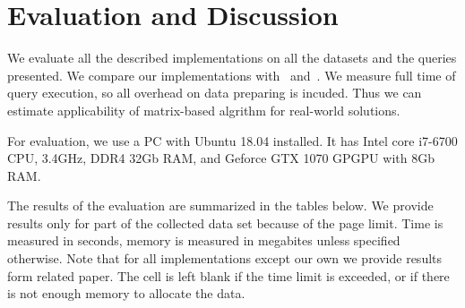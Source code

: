 \section{Evaluation and Discussion}

We evaluate all the described implementations on all the datasets and the queries presented.
We compare our implementations with~\cite{Mishin:2019:ECP:3327964.3328503} and~\cite{Kuijpers:2019:ESC:3335783.3335791}.
We measure full time of query execution, so all overhead on data preparing is incuded.
Thus we can estimate applicability of matrix-based algrithm for real-world solutions.

For evaluation, we use a PC with Ubuntu 18.04 installed.
It has Intel core i7-6700 CPU, 3.4GHz, DDR4 32Gb RAM, and Geforce GTX 1070 GPGPU with 8Gb RAM.

The results of the evaluation are summarized in the tables below.
We provide results only for part of the collected data set because of the page limit.
Time is measured in seconds, memory is measured in megabites unless specified otherwise.
Note that for all implementations except our own we provide results form related paper.
The cell is left blank if the time limit is exceeded, or if there is not enough memory to allocate the data. %

